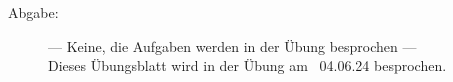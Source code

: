 \documentclass[a4paper,11pt]{scrartcl}
\begin{document}

\begin{description}
\item[Abgabe:] --- Keine, die Aufgaben werden in der Übung besprochen ---\\
Dieses Übungsblatt wird in der Übung am ~04.06.24 besprochen.



\end{description}
\end{document}
